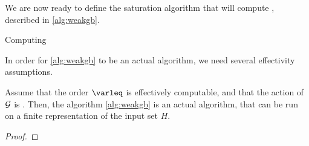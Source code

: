 We are now ready to define the saturation algorithm that will compute 
, described in \cref{alg:weakgb}.

\begin{algorithm}
    \caption{Computing }
    \label{alg:weakgb}
\end{algorithm}

In order for \cref{alg:weakgb} to be an actual algorithm, we need several 
effectivity assumptions. 

\begin{lemma}
  \label{lem:weakgb-computable}
  Assume that the order $\varleq$ is effectively computable, and 
  that the action of $\mathcal{G}$ is . Then, the
  algorithm \cref{alg:weakgb} is an actual algorithm,
  that can be run on a finite representation of the input set $H$.
\end{lemma}
\begin{proof}
\end{proof}

